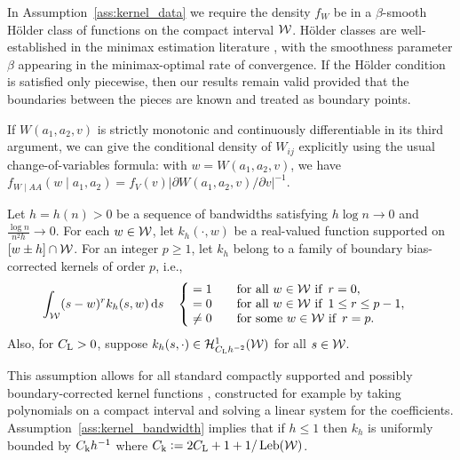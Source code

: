In Assumption~\ref{ass:kernel_data} we require
the density $f_W$ be in a $\beta$-smooth H\"older class of
functions on the compact interval $\mathcal{W}$.
H\"older classes are well-established in the minimax estimation literature
\citep{gine2021mathematical}, with the smoothness parameter $\beta$ appearing
in the minimax-optimal rate of convergence.
If the H\"older condition is satisfied only piecewise,
then our results remain valid provided that the boundaries
between the pieces are known and treated as boundary points.

If $W(a_1, a_2, v)$ is strictly monotonic and continuously differentiable in
its third argument,
we can give the conditional density of $W_{i j}$ explicitly
using the usual change-of-variables formula: with $w=W(a_1,a_2,v)$,
we have
$f_{W \mid AA}(w \mid a_1,a_2) = f_V(v)
\big|\partial W(a_1,a_2,v)/\partial v\big|^{-1}$.

\begin{assumption}\label{ass:kernel_bandwidth}%
  \onehalfspacing

  Let $h = h(n) > 0$
  be a sequence of bandwidths
  satisfying $h \log n \to 0$
  and $\frac{\log n}{n^2h} \to 0$.
  For each $w \in \mathcal{W}$, let $k_h(\cdot, w)$
  be a real-valued function supported on
  $[w \pm h] \cap \mathcal{W}$.
  For an integer $p \geq 1$,
  let $k_h$ belong to a family of
  boundary bias-corrected kernels of order $p$, i.e.,
  \begin{align*}
    \int_{\mathcal{W}}
    (s-w)^r k_h(s,w) \,\mathrm{d}s
    \quad
    \begin{cases}
      \begin{alignedat}{2}
        &= 1 &\qquad &\text{for all } w \in \mathcal{W} \text{ if }\, r = 0, \\
        &= 0 & &\text{for all } w \in \mathcal{W} \text{ if }\, 1 \leq r \leq p-1, \\
        &\neq 0 & &\text{for some } w \in \mathcal{W} \text{ if }\, r = p.
      \end{alignedat}
    \end{cases}
  \end{align*}
  Also, for $C_{\mathrm{L}} > 0$,
  suppose $k_h(s, \cdot) \in \mathcal{H}^1_{C_{\mathrm{L}} h^{-2}}(\mathcal{W})$
  for all $s \in \mathcal{W}$.
\end{assumption}

This assumption allows for all standard compactly supported
and possibly boundary-corrected kernel functions
\citep{wand1994kernel,simonoff2012smoothing}, constructed for example by taking
polynomials on a compact interval and solving a linear system for the
coefficients. Assumption~\ref{ass:kernel_bandwidth} implies that
if $h \leq 1$ then
$k_h$ is uniformly bounded by
$C_{\mathrm{k}} h^{-1}$ where $C_{\mathrm{k}} \vcentcolon = 2 C_{\mathrm{L}} + 1 + 1/\operatorname{Leb}(\mathcal{W})$.

